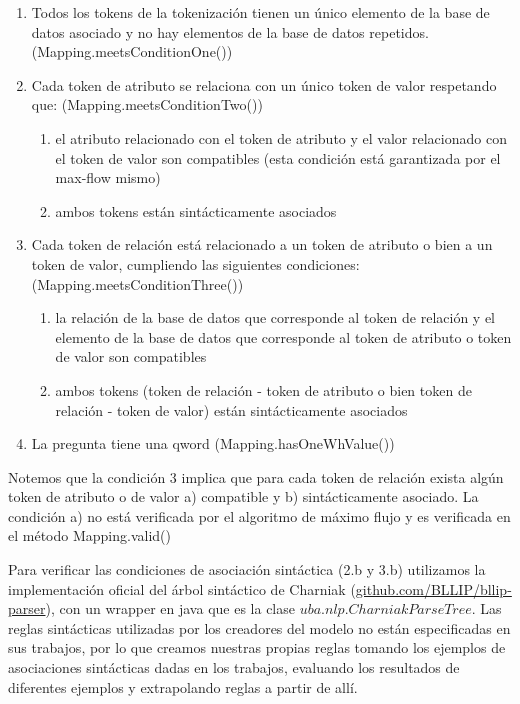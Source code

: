 \begin{enumerate}
\item Todos  los tokens de la tokenización tienen un único elemento de la base de datos asociado y no hay elementos de la base de datos repetidos. (Mapping.meetsConditionOne())
\item Cada token de atributo se relaciona con un único token de valor respetando que: (Mapping.meetsConditionTwo())
\begin{enumerate}
\item el atributo relacionado con el token de atributo y el valor relacionado con el token de valor son compatibles (esta condición está garantizada por el max-flow mismo)
\item ambos tokens están sintácticamente asociados
\end{enumerate}
\item Cada token de relación está relacionado a un token de atributo o bien a un token de valor, cumpliendo las siguientes condiciones: (Mapping.meetsConditionThree())
\begin{enumerate}
\item	la relación de la base de datos que corresponde al token de relación y el elemento de la base de datos que corresponde al token de atributo o token de valor son compatibles
\item ambos tokens (token de relación - token de atributo o bien token de relación - token de valor) están sintácticamente asociados
\end{enumerate}
\item La pregunta tiene una qword (Mapping.hasOneWhValue())
\end{enumerate}

Notemos que la condición 3 implica que para cada token de relación exista algún token de atributo o de valor a) compatible y b) sintácticamente asociado. La condición a) no está verificada por el algoritmo de máximo flujo y es verificada en el método Mapping.valid()

Para verificar las condiciones de asociación sintáctica (2.b y 3.b) utilizamos la implementación oficial del árbol sintáctico de Charniak (\url{github.com/BLLIP/bllip-parser}), con un wrapper en java que es la clase $uba.nlp.CharniakParseTree$. Las reglas sintácticas utilizadas por los creadores del modelo no están especificadas en sus trabajos, por lo que creamos nuestras propias reglas tomando los ejemplos de asociaciones sintácticas dadas en los trabajos, evaluando los resultados de diferentes ejemplos y extrapolando reglas a partir de allí.



